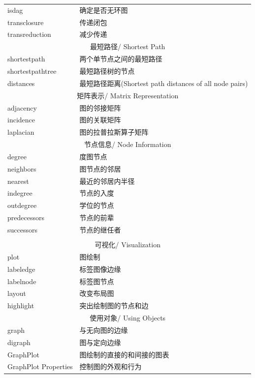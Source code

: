 \begin{longtable}{|l|l|}
            isdag &确定是否无环图\\
            transclosure  &传递闭包\\
            transreduction & 减少传递\\
            \hline
            \multicolumn{2}{|c|}{最短路径/ Shortest Path}\\
            \hline
            shortestpath & 两个单节点之间的最短路径\\
            shortestpathtree & 最短路径树的节点\\
            distances &最短路径距离(Shortest path distances of all node pairs)\\
            \hline
            \multicolumn{2}{|c|}{矩阵表示/ Matrix Representation}\\
            \hline
            adjacency & 图的邻接矩阵\\
            incidence & 图的关联矩阵\\
            laplacian & 图的拉普拉斯算子矩阵\\
            \hline
            \multicolumn{2}{|c|}{节点信息/ Node Information}\\
            \hline
            degree &度图节点\\
            neighbors & 图节点的邻居\\
            nearest & 最近的邻居内半径\\
            indegree & 节点的入度\\
            outdegree & 学位的节点\\
            predecessors & 节点的前辈\\
            successors & 节点的继任者\\{} & {}\\
            \hline
            \multicolumn{2}{|c|}{可视化/ Visualization}\\
            \hline
            plot & 图绘制\\
            labeledge & 标签图像边缘\\
            labelnode & 标签图节点\\
            layout & 改变布局图\\
            highlight & 突出绘制图的节点和边\\
            \hline
            \multicolumn{2}{|c|}{使用对象/ Using Objects}\\
            \hline
            graph & 与无向图的边缘\\
            digraph & 图与定向边缘\\
            GraphPlot & 图绘制的直接的和间接的图表\\
            GraphPlot Properties & 控制图的外观和行为\\
            \hline
            \end{longtable}
